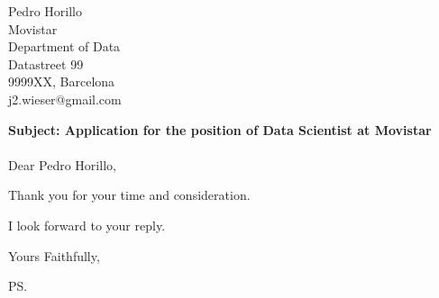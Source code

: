 \documentclass{letter}
\makeatletter
\newcommand{\letterdate}{2/1/2021}
\newcommand{\jobopening}{Data Scientist}
\newcommand{\companynameperson}{Pedro Horillo}
\newcommand{\companyname}{Movistar}
\newcommand{\companydepartment}{Department of Data}
\newcommand{\companystreet}{Datastreet 99}
\newcommand{\companypostal}{9999XX}
\newcommand{\companycity}{Barcelona}
\newcommand{\companyemail}{j2.wieser@gmail.com}
\makeatother
\begin{document}
\begin{letter}{\companynameperson \\ \companyname \\ \companydepartment \\ \companystreet \\ \companypostal, \companycity \\ \companyemail}


	\opening{
		{\bf Subject: Application for the position of {\jobopening} at \companyname} \\ ~ \\
	          Dear \companynameperson,
	}

%	

	Thank you for your time and consideration.

	I look forward to your reply.

	\closing{Yours Faithfully,}

	\ps


\end{letter}
\end{document}

